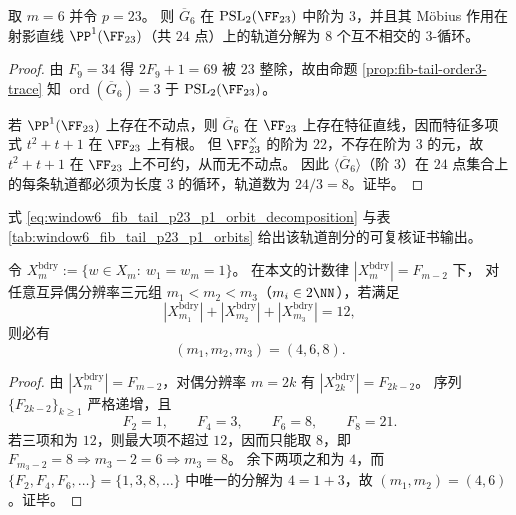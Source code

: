 \begin{proposition}[\texorpdfstring{$m=6$}{m=6} 与 \texorpdfstring{$p=23$}{p=23}：射影直线上的 \(3\)-循环轨道剖分]\label{prop:fib-tail-p23-orbits}
取 \(m=6\) 并令 \(p=23\)。
则 \(\overline{G}_6\) 在 \(\mathrm{PSL}_2(\FF_{23})\) 中阶为 \(3\)，并且其 Möbius 作用在射影直线 \(\PP^1(\FF_{23})\)（共 \(24\) 点）上的轨道分解为 \(8\) 个互不相交的 \(3\)-循环。
\end{proposition}
\begin{proof}
由 \(F_9=34\) 得 \(2F_9+1=69\) 被 \(23\) 整除，故由命题 \ref{prop:fib-tail-order3-trace} 知 \(\operatorname{ord}(\overline{G}_6)=3\) 于 \(\mathrm{PSL}_2(\FF_{23})\)。
\par
若 \(\PP^1(\FF_{23})\) 上存在不动点，则 \(\overline{G}_6\) 在 \(\FF_{23}\) 上存在特征直线，因而特征多项式 \(t^2+t+1\) 在 \(\FF_{23}\) 上有根。
但 \(\FF_{23}^\times\) 的阶为 \(22\)，不存在阶为 \(3\) 的元，故 \(t^2+t+1\) 在 \(\FF_{23}\) 上不可约，从而无不动点。
因此 \(\langle \overline{G}_6\rangle\)（阶 \(3\)）在 \(24\) 点集合上的每条轨道都必须为长度 \(3\) 的循环，轨道数为 \(24/3=8\)。证毕。
\end{proof}
式 \eqref{eq:window6_fib_tail_p23_p1_orbit_decomposition} 与表 \ref{tab:window6_fib_tail_p23_p1_orbits} 给出该轨道剖分的可复核证书输出。




\begin{theorem}\label{thm:bdry-three-window-sum12-unique-even-triple}
令
\(
X^{\mathrm{bdry}}_m:=\{w\in X_m:\ w_1=w_m=1\}
\)。
在本文的计数律 \(|X^{\mathrm{bdry}}_m|=F_{m-2}\) 下，
对任意互异偶分辨率三元组 \(m_1<m_2<m_3\)（\(m_i\in 2\NN\)），若满足
\[
|X^{\mathrm{bdry}}_{m_1}|+|X^{\mathrm{bdry}}_{m_2}|+|X^{\mathrm{bdry}}_{m_3}|=12,
\]
则必有
\[
(m_1,m_2,m_3)=(4,6,8).
\]
\end{theorem}
\begin{proof}
由 \(|X^{\mathrm{bdry}}_m|=F_{m-2}\)，对偶分辨率 \(m=2k\) 有
\(
|X^{\mathrm{bdry}}_{2k}|=F_{2k-2}
\)。
序列 \(\{F_{2k-2}\}_{k\ge 1}\) 严格递增，且
\[
F_{2}=1,\qquad F_{4}=3,\qquad F_{6}=8,\qquad F_{8}=21.
\]
若三项和为 \(12\)，则最大项不超过 \(12\)，因而只能取 \(8\)，即
\(
F_{m_3-2}=8
\Rightarrow
m_3-2=6
\Rightarrow
m_3=8
\)。
余下两项之和为 \(4\)，而 \(\{F_{2},F_{4},F_{6},\dots\}=\{1,3,8,\dots\}\) 中唯一的分解为 \(4=1+3\)，故 \((m_1,m_2)=(4,6)\)。证毕。
\end{proof}

